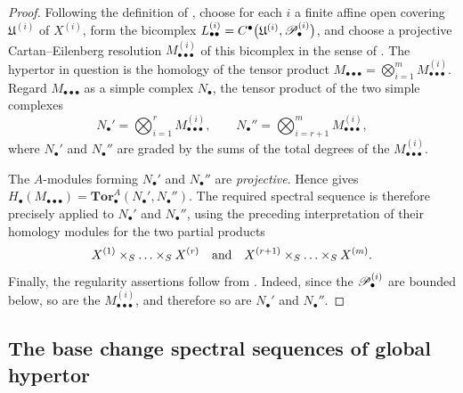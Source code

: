 \begin{proof}
Following the definition of , choose for each $i$
a finite affine open covering $\mathfrak U^{(i)}$ of $X^{(i)}$,
form the bicomplex $L_{\bullet\bullet}^{(i)}
=
C^\bullet
\bigl(
\mathfrak U^{(i)},\mathscr{P}_\bullet^{(i)}
\bigr)$,
and choose a projective Cartan--Eilenberg resolution
$M_{\bullet\bullet\bullet}^{(i)}$ of this bicomplex in the sense
of .  The hypertor in question is the homology
of the tensor product $M_{\bullet\bullet\bullet}
=
\bigotimes_{i=1}^{m}
M_{\bullet\bullet\bullet}^{(i)}$.
Regard $M_{\bullet\bullet\bullet}$ as a simple complex
$N_\bullet$, the tensor product of the two simple complexes
\[
  N_\bullet'
  =
  \bigotimes_{i=1}^{r}
  M_{\bullet\bullet\bullet}^{(i)},
  \qquad
  N_\bullet''
  =
  \bigotimes_{i=r+1}^{m}
  M_{\bullet\bullet\bullet}^{(i)},
\]
where $N_\bullet'$ and $N_\bullet''$ are graded by the sums of the
total degrees of the $M_{\bullet\bullet\bullet}^{(i)}$.

The $A$-modules forming $N_\bullet'$ and $N_\bullet''$ are
\emph{projective}.  Hence  gives $H_\bullet(M_{\bullet\bullet\bullet})
=
\mathbf{Tor}_\bullet^A(N_\bullet',N_\bullet'')$.
The required spectral sequence is therefore precisely
 applied to $N_\bullet'$ and $N_\bullet''$,
using the preceding interpretation of their homology modules for
the two partial products
\[
  X^{(1)}\times_S\ldots\times_SX^{(r)}
  \quad\hbox{and}\quad
  X^{(r+1)}\times_S\ldots\times_SX^{(m)}.
\]
Finally, the regularity assertions follow from
.  Indeed, since the
$\mathscr{P}_\bullet^{(i)}$ are bounded below, so are the
$M_{\bullet\bullet\bullet}^{(i)}$, and therefore so are
$N_\bullet'$ and $N_\bullet''$.
\end{proof}

\subsection{The base change spectral sequences of global hypertor}
\label{subsection:III.6.9}
\label{III.6.9}

